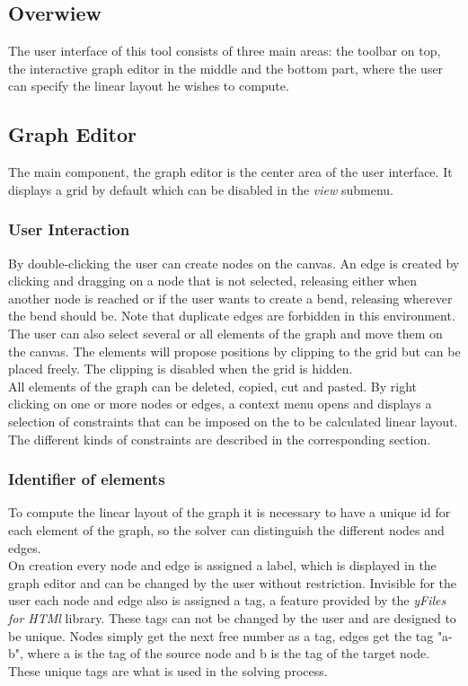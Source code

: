 \subsection{Overwiew}
The user interface of this tool consists of three main areas: the toolbar on top, the interactive graph editor in the middle and the bottom part, where the user can specify the linear layout he wishes to compute.\\
\subsection{Graph Editor}
The main component, the graph editor is the center area of the user interface. It displays a grid by default which can be disabled in the \textit{view} submenu.\\
\subsubsection{User Interaction}
By double-clicking the user can create nodes on the canvas. An edge is created by clicking and dragging on a node that is not selected, releasing either when another node is reached or if the user wants to create a bend, releasing wherever the bend should be. Note that duplicate edges are forbidden in this environment. \\
The user can also select several or all elements of the graph and move them on the canvas. The elements will propose positions by clipping to the grid but can be placed freely. The clipping is disabled when the grid is hidden.\\
All elements of the graph can be deleted, copied, cut and pasted. 
By right clicking on one or more nodes or edges, a context menu opens and displays a selection of constraints that can be imposed on the to be calculated linear layout. The different kinds of constraints are described in the corresponding section.
\subsubsection{Identifier of elements}
To compute the linear layout of the graph it is necessary to have a unique id for each element of the graph, so the solver can distinguish the different nodes and edges.\\
On creation every node and edge is assigned a label, which is displayed in the graph editor and can be changed by the user without restriction. Invisible for the user each node and edge also is assigned a tag, a feature provided by the \textit{yFiles for HTMl} library. These tags can not be changed by the user and are designed to be unique. Nodes simply get the next free number as a tag, edges get the tag "a-b", where a is the tag of the source node and b is the tag of the target node. These unique tags are what is used in the solving process.\\
